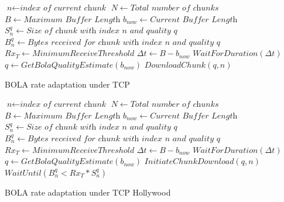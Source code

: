 \begin{algorithm}[t!]
	\begin{algorithmic}[1]
		\State $\textit{n} \gets \textit{index of current chunk}$
		\State $N \gets \textit{Total number of chunks}$
		\State $B \gets \textit{Maximum Buffer Length}$
		\State $b_{now} \gets \textit{Current Buffer Length}$
		\State $S_n^q \gets \textit{Size of chunk with index n and quality q}$
		\State $B_n^q  \gets \textit{Bytes received for chunk with index n and quality q }$
		\State $Rx_T \gets Minimum Receive Threshold$
				\State $\Delta t \gets B - b_{now}$
				\State $WaitForDuration (\Delta t)$
			\EndIf
			\State ${q \gets GetBolaQualityEstimate(b_{now})}$
			\State ${DownloadChunk(q, n)}$
		\EndWhile
		\EndProcedure
	\end{algorithmic}
	\caption{BOLA rate adaptation under TCP}
    	\label{algo:tcp_dash}
\end{algorithm}

\begin{algorithm}
	\begin{algorithmic}[1]
		\State $\textit{n} \gets \textit{index of current chunk}$
		\State $N \gets \textit{Total number of chunks}$
		\State $B \gets \textit{Maximum Buffer Length}$
		\State $b_{now} \gets \textit{Current Buffer Length}$
		\State $S_n^q \gets \textit{Size of chunk with index n and quality q}$
		\State $B_n^q  \gets \textit{Bytes received for chunk with index n and quality q }$
		\State $Rx_T \gets Minimum Receive Threshold$
				\State $\Delta t \gets B - b_{now}$
				\State $WaitForDuration (\Delta t)$
			\EndIf
			\State ${q \gets GetBolaQualityEstimate(b_{now})}$
			\State $InitiateChunkDownload(q, n)$
			\State $WaitUntil (B_n^q < Rx_T * S_n^q)$
		\EndWhile
		\EndProcedure
	\end{algorithmic}
	\caption{BOLA rate adaptation under TCP Hollywood}
	\label{algo:tcph_dash}
\end{algorithm}




%
%
